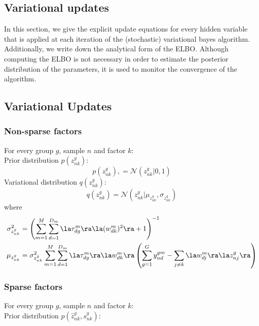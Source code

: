 \subsection{Variational updates}
In this section, we give the explicit update equations for every hidden variable that is applied at each iteration of the (stochastic) variational bayes algorithm.\\
Additionally, we write down the analytical form of the ELBO. Although computing the ELBO is not necessary in order to estimate the posterior distribution of the parameters, it is used to monitor the convergence of the algorithm.

\subsection{Variational Updates}

\subsubsection{Non-sparse factors}
For every group $g$, sample $n$ and factor $k$: \\

Prior distribution $p(z_{nk}^g)$:\\
\[
	p(z_{nk}^g), = \mathcal{N} (z_{nk}^g |0,1)
\]
Variational distribution $q(z^g_{nk})$:\\
\begin{equation}
   q(z^g_{nk}) = \mathcal{N} ( z_{nk}^g | \mu_{z_{nk}^g}, \sigma_{z_{nk}^g} )
\end{equation}
where
\begin{equation} \begin{aligned}
	\sigma_{z_{nk}^{g}}^2 &= \left( \sum_{m=1}^{M} \sum_{d=1}^{D_m} \la\tau_{dg}^m \ra \la (w_{dk}^m)^2 \ra + 1 \right)^{-1}\\
	\mu_{z_{nk}^g} &= \sigma_{z_{nk}^g}^2 \sum_{m=1}^{M} \sum_{d=1}^{D_m} \la\tau_{dg}^m\ra \la w_{dk}^m \ra \left(\sum_{g=1}^{G} y_{nd}^{gm} - \sum_{j \neq k} \la w_{dj}^m \ra \la z_{nj}^g \ra \right)
\end{aligned} \end{equation}


\subsubsection{Sparse factors}
For every group $g$, sample $n$ and factor $k$: \\

Prior distribution $p(\hat{z}_{nk}^g,s_{nk}^g)$:\\

